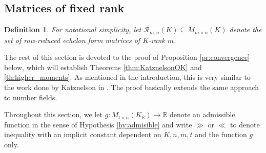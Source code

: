 \documentclass{amsart}
\newtheorem{corollary}[theorem]{Corollary}
\newtheorem{definition}[theorem]{Definition}
\DeclareMathOperator{\card}{\texttt{\#}}
\DeclareMathOperator{\rank}{rk}
\DeclareMathOperator{\N}{N}
\begin{document}

\subsection{Matrices of fixed rank}



\begin{definition}
For notational simplicity, let $\mathcal{R}_{m,n}(K)\subseteq M_{m \times n}(K)$ denote the set of row-reduced echelon form matrices of $K$-rank $m$. 
\end{definition}
The rest of this section is devoted to the proof of Proposition \ref{pr:convergence} below, which will establish Theorems \ref{thm:KatznelsonOK} and \ref{th:higher_moments}. As mentioned in the introduction, this is very similar to the work done by Katznelson in \cite{K1994}. The proof basically extends the same approach to number fields. \par
Throughout this section, we let $g:M_{t \times n}(K_\mathbb{R}) \rightarrow \mathbb{R}$ denote an admissible function in the sense of Hypothesis \ref{hy:admisible} and write $\gg$ or $\ll$
to denote inequality with an implicit constant dependent on $K,n,m,t$ and the function $g$ only.
\end{document}
